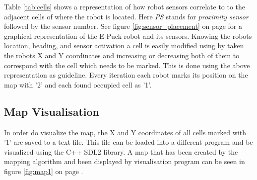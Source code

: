 Table \ref{tab:cells} shows a representation of how robot sensors correlate to to the adjacent cells of where the robot is located. Here \textit{PS} stands for \textit{proximity sensor} followed by the sensor number. See figure \ref{fig:sensor_placement} on page \pageref{fig:sensor_placement} for a graphical representation of the E-Puck robot and its sensors.  
Knowing the robots location, heading, and sensor activation a cell is easily modified using by taken the robots X and Y coordinates and increasing or decreasing both of them to correspond with the cell which needs to be marked. This is done using the above representation as guideline. 
Every iteration each robot marks its position on the map with '2' and each found occupied cell as '1'.\\

\subsection{Map Visualisation}
In order do visualize the map, the X and Y coordinates of all cells marked with '1' are saved to a text file.
This file can be loaded into a different program and be visualized using the C++ SDL2 library.
A map that has been created by the mapping algorithm and been displayed by visualisation program can be seen in figure \ref{fig:map1} on page \pageref{fig:map1}. 
